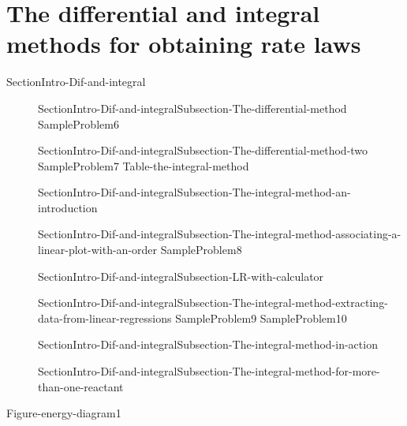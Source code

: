 \documentclass[main.tex]{subfiles}
\newcommand\chapterlabel{Ch-kinetics}\setcounter{figurenewcounter}{0}\setcounter{tablenewcounter}{0}\setcounter{formulanewcounter}{0}\chapterpicture{../{\chapterlabel}/figure1}\chapterpicturelabel{PxFuel}
\begin{document}
\section{The differential and integral methods for obtaining rate laws}{SectionIntro-Dif-and-integral}
\sloppy \begin{description}
\item[] {SectionIntro-Dif-and-integralSubsection-The-differential-method}
  {SampleProblem6}
\item[] {SectionIntro-Dif-and-integralSubsection-The-differential-method-two}
  {SampleProblem7}
  {Table-the-integral-method}
 \item[] {SectionIntro-Dif-and-integralSubsection-The-integral-method-an-introduction}
\item[] {SectionIntro-Dif-and-integralSubsection-The-integral-method-associating-a-linear-plot-with-an-order}
  {SampleProblem8}

\item[] {SectionIntro-Dif-and-integralSubsection-LR-with-calculator}

\item[] {SectionIntro-Dif-and-integralSubsection-The-integral-method-extracting-data-from-linear-regressions}
  {SampleProblem9}
  {SampleProblem10}
\item[] {SectionIntro-Dif-and-integralSubsection-The-integral-method-in-action}
\item[] {SectionIntro-Dif-and-integralSubsection-The-integral-method-for-more-than-one-reactant}
\end{description}
  {Figure-energy-diagram1}
\end{document}
